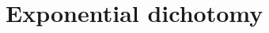 \documentclass[12pt,reqno]{amsart}
\def\R{{\mathbb R}}
\begin{document}

\section{Exponential dichotomy}
\end{document}

